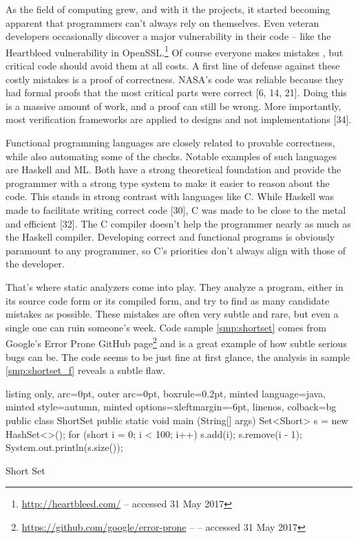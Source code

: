 \documentclass[a4paper, 16pt, oneside]{Thesis}
\begin{document}
As the field of computing grew, and with it the projects, it started
becoming apparent that programmers can't always rely on themselves. Even
veteran developers occasionally discover a major vulnerability in their
code -- like the Heartbleed vulnerability in OpenSSL.\footnote{\url{http://heartbleed.com/}
  -- accessed 31 May 2017} Of course everyone makes mistakes , but
critical code should avoid them at all costs. A first line of defense
against these costly mistakes is a proof of correctness. NASA's code was
reliable because they had formal proofs that the most critical parts
were correct {[}6, 14, 21{]}. Doing this is a massive amount of work,
and a proof can still be wrong. More importantly, most verification
frameworks are applied to designs and not implementations {[}34{]}.

Functional programming languages are closely related to provable
correctness, while also automating some of the checks. Notable examples
of such languages are Haskell and ML. Both have a strong theoretical
foundation and provide the programmer with a strong type system to make
it easier to reason about the code. This stands in strong contrast with
languages like C. While Haskell was made to facilitate writing correct
code {[}30{]}, C was made to be close to the metal and efficient
{[}32{]}. The C compiler doesn't help the programmer nearly as much as
the Haskell compiler. Developing correct and functional programs is
obviously paramount to any programmer, so C's priorities don't always
align with those of the developer.

That's where static analyzers come into play. They analyze a program,
either in its source code form or its compiled form, and try to find as
many candidate mistakes as possible. These mistakes are often very
subtle and rare, but even a single one can ruin someone's week. Code
sample \ref{smp:shortset} comes from Google's Error Prone GitHub
page\footnote{\url{https://github.com/google/error-prone} -- -- accessed
  31 May 2017} and is a great example of how subtle serious bugs can be.
The code seems to be just fine at first glance, the analysis in sample
\ref{smp:shortset_f} reveals a subtle flaw.

\begin{code}
  \begin{tcblisting}{listing only, 
  arc=0pt,
  outer arc=0pt, 
  boxrule=0.2pt,
  minted language=java,
  minted style=autumn,
  minted options={xleftmargin=-6pt, linenos},
  colback=bg }
public class ShortSet {
  public static void main (String[] args) {
    Set<Short> s = new HashSet<>();
    for (short i = 0; i < 100; i++) {
      s.add(i);
      s.remove(i - 1);
    }
    System.out.println(s.size());
  }
}
\end{tcblisting}
\caption{Short Set}\label{smp:shortset}
\end{code}
\end{document}
